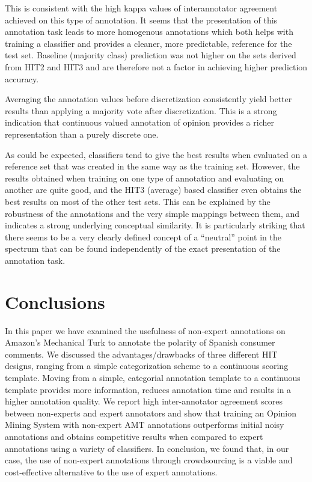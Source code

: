 \documentclass[11pt]{elsarticle}
\begin{document}
This is consistent with the high kappa values of interannotator agreement achieved on this type of annotation. It seems that the presentation of this annotation task leads to more homogenous annotations which both helps with training a classifier and provides a cleaner, more predictable, reference for the test set. Baseline (majority class) prediction was not higher on the sets derived from HIT2 and HIT3 and are therefore not a factor in achieving higher prediction accuracy.

Averaging the annotation values before discretization consistently yield better results than applying a majority vote after discretization. This is a strong indication that continuous valued annotation of opinion provides a richer representation than a purely discrete one.

As could be expected, classifiers tend to give the best results when evaluated on a reference set that was created in the same way as the training set. However, the results obtained when training on one type of annotation and evaluating on another are quite good, and the HIT3 (average) based classifier even obtains the best results on most of the other test sets. This can be explained by the robustness of the annotations and the very simple mappings between them, and indicates a strong underlying conceptual similarity. It is particularly striking that there seems to be a very clearly defined concept of a ``neutral'' point in the spectrum that can be found independently of the exact presentation of the annotation task.

\section{Conclusions}
\label{sect:conclusions}

In this paper we have examined the usefulness of non-expert annotations on Amazon's Mechanical Turk to annotate the polarity of Spanish consumer comments. We discussed the advantages/drawbacks of three different HIT designs, ranging from a simple categorization scheme to a continuous scoring template. Moving from a simple, categorial annotation template to a continuous template provides more information, reduces annotation time and results in a higher annotation quality. We report high inter-annotator agreement scores between non-experts and expert annotators and show that training an Opinion Mining System with non-expert AMT annotations outperforms initial noisy annotations and obtains competitive results when compared to expert annotations using a variety of classifiers. In conclusion, we found that, in our case, the use of non-expert annotations through crowdsourcing is a viable and cost-effective alternative to the use of expert annotations.
\end{document}
